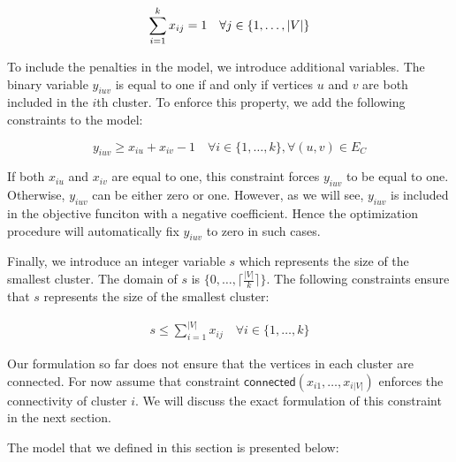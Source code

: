 \documentclass[conference,compsoc]{IEEEtran}
\begin{document}
\begin{equation}
\sum_{i=1}^k x_{ij} = 1 \quad \forall j \in \{1, \ldots, |V|\} \label{cons:assign}\\
\end{equation}

To include the penalties in the model, we introduce additional
variables. The binary variable $y_{iuv}$ is equal to one if and only if
vertices $u$ and $v$ are both included in the $i$th cluster. To enforce
this property, we add the following constraints to the model:

\begin{equation}
y_{iuv} \geq x_{iu} + x_{iv} -1 \quad \forall i \in \{1, \ldots, k\}, \forall (u, v) \in E_{C}
\end{equation}

If both $x_{iu}$ and $x_{iv}$ are equal to one, this constraint forces
$y_{iuv}$ to be equal to one. Otherwise, $y_{iuv}$ can be either zero or
one. However, as we will see, $y_{iuv}$ is included in the objective
funciton with a negative coefficient. Hence the optimization procedure
will automatically fix $y_{iuv}$ to zero in such cases.

Finally, we introduce an integer variable $s$ which represents the size
of the smallest cluster. The domain of $s$ is
$\{0, \ldots, \lceil \frac{|V|}{k} \rceil \}$. The following constraints
ensure that $s$ represents the size of the smallest cluster:

\begin{align}
s \leq \sum_{i=1}^{|V|} x_{ij} \quad \forall i \in \{1, \ldots, k\}
\end{align}

Our formulation so far does not ensure that the vertices in each cluster
are connected. For now assume that constraint
$\mathsf{connected}(x_{i1}, \ldots, x_{i|V|})$ enforces the connectivity of
cluster $i$. We will discuss the exact formulation of this constraint in
the next section. 

The model that we defined in this section is presented
below:
\end{document}
